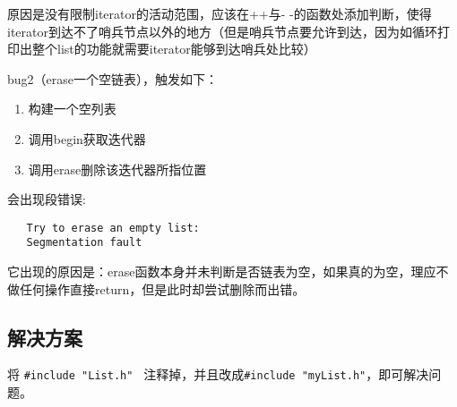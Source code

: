 \documentclass[UTF8]{ctexart}
\begin{document}
原因是没有限制iterator的活动范围，应该在++与- -的函数处添加判断，使得iterator到达不了哨兵节点以外的地方（但是哨兵节点要允许到达，因为如循环打印出整个list的功能就需要iterator能够到达哨兵处比较）\


bug2（erase一个空链表），触发如下：

\begin{enumerate}
    \item 构建一个空列表
    \item 调用begin获取迭代器
    \item 调用erase删除该迭代器所指位置
\end{enumerate}

会出现段错误:
\begin{verbatim}
   Try to erase an empty list:
   Segmentation fault
\end{verbatim}

它出现的原因是：erase函数本身并未判断是否链表为空，如果真的为空，理应不做任何操作直接return，但是此时却尝试删除而出错。\

\subsection{解决方案}

将 \texttt{\#include "List.h" } 注释掉，并且改成\texttt{\#include "myList.h"}，即可解决问题。
\end{document}
